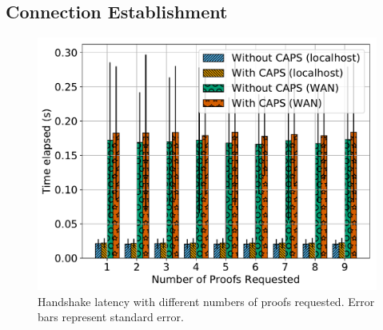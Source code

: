 \subsection{Connection Establishment}
\label{sec:evaluation:performance}


\begin{figure}[t]
  \centering
  \includegraphics[width=\linewidth]{fig/eval_tls_ext/0-time_elapsed_vs_num_proofs_requested}
  \caption{Handshake latency with different numbers of proofs requested. Error
  bars represent standard error.}
  \label{fig:evaltlsext:numproof}
\end{figure}

